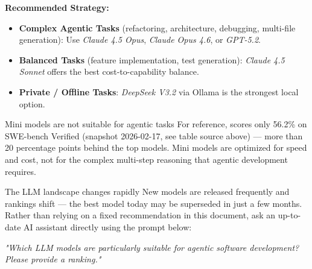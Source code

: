 \textbf{Recommended Strategy:}
\begin{itemize}
   \item \textbf{Complex Agentic Tasks} (refactoring, architecture, debugging,
      multi-file generation): Use \textit{Claude 4.5 Opus}, \textit{Claude Opus 4.6},
      or \textit{GPT-5.2}.
   \item \textbf{Balanced Tasks} (feature implementation, test generation):
      \textit{Claude 4.5 Sonnet} offers the best cost-to-capability balance.
   \item \textbf{Private / Offline Tasks}: \textit{DeepSeek V3.2} via Ollama
      is the strongest local option.
\end{itemize}

\begin{boxwarning}{Mini models are not suitable for agentic tasks}
For reference,  scores only 56.2\% on SWE-bench Verified
(snapshot 2026-02-17, see table source above) — more than 20 percentage points
behind the top models.
Mini models are optimized for speed and cost, not for the complex multi-step
reasoning that agentic development requires.
\end{boxwarning}

\begin{boxhint}{The LLM landscape changes rapidly}
New models are released frequently and rankings shift — the best model today
may be superseded in just a few months.
Rather than relying on a fixed recommendation in this document,
ask an up-to-date AI assistant directly using the prompt below:

\medskip
\textit{"Which LLM models are particularly suitable for agentic software
development? Please provide a ranking."}
\end{boxhint}
